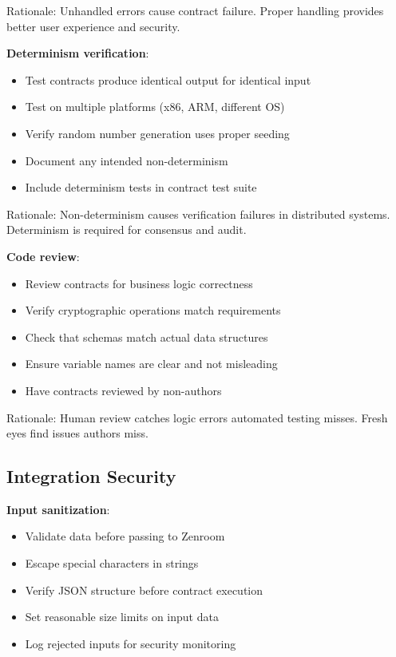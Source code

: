 Rationale: Unhandled errors cause contract failure. Proper handling
provides better user experience and security.

\textbf{Determinism verification}:

\begin{itemize}
\item Test contracts produce identical output for identical input
\item Test on multiple platforms (x86, ARM, different OS)
\item Verify random number generation uses proper seeding
\item Document any intended non-determinism
\item Include determinism tests in contract test suite
\end{itemize}

Rationale: Non-determinism causes verification failures in distributed
systems. Determinism is required for consensus and audit.

\textbf{Code review}:

\begin{itemize}
\item Review contracts for business logic correctness
\item Verify cryptographic operations match requirements
\item Check that schemas match actual data structures
\item Ensure variable names are clear and not misleading
\item Have contracts reviewed by non-authors
\end{itemize}

Rationale: Human review catches logic errors automated testing
misses. Fresh eyes find issues authors miss.

\subsection{Integration Security}

\textbf{Input sanitization}:

\begin{itemize}
\item Validate data before passing to Zenroom
\item Escape special characters in strings
\item Verify JSON structure before contract execution
\item Set reasonable size limits on input data
\item Log rejected inputs for security monitoring
\end{itemize}

